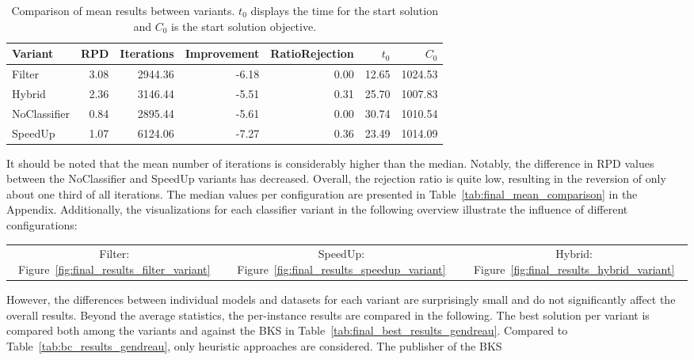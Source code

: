 \begin{table}
	\centering
	\small
	\begin{tabular}{lrrrrrr}
		\toprule
		Variant      & RPD  & Iterations & Improvement & RatioRejection & $t_0$ & $C_0$   \\
		\midrule
		Filter       & 3.08 & 2944.36    & -6.18       & 0.00           & 12.65 & 1024.53 \\
		Hybrid       & 2.36 & 3146.44    & -5.51       & 0.31           & 25.70 & 1007.83 \\
		NoClassifier & 0.84 & 2895.44    & -5.61       & 0.00           & 30.74 & 1010.54 \\
		SpeedUp      & 1.07 & 6124.06    & -7.27       & 0.36           & 23.49 & 1014.09 \\
		\bottomrule
	\end{tabular}
	\caption[Comparison of mean results between variants.]{Comparison of mean results between variants. $t_0$ displays the time for the start solution and $C_0$ is the start solution objective.}
	\label{tab:mean_final_results}
\end{table}
It should be noted that the mean number of iterations is considerably higher than the median. Notably, the difference in \gls{RPD}
values between the NoClassifier and SpeedUp variants has decreased. Overall, the rejection ratio is quite low, resulting in
the reversion of only about one third of all iterations. The median values per configuration are presented in
Table~\ref{tab:final_mean_comparison} in the Appendix. Additionally, the visualizations for each classifier variant in the following overview
illustrate the influence of different configurations:
\begin{table}[ht]
	\centering
	\setlength{\tabcolsep}{12pt}
	\begin{tabular}{ccc}
		Filter: Figure~\ref{fig:final_results_filter_variant} & SpeedUp: Figure~\ref{fig:final_results_speedup_variant} & Hybrid: Figure~\ref{fig:final_results_hybrid_variant}
	\end{tabular}
\end{table}
However, the differences between individual models and datasets for each variant are surprisingly small and do not significantly
affect the overall results. Beyond the average statistics, the per-instance results are compared in the following. The best solution
per variant is compared both among the variants and against the \gls{BKS} in Table~\ref{tab:final_best_results_gendreau}. Compared to Table~\ref{tab:bc_results_gendreau},
only heuristic approaches are considered. The publisher of the \gls{BKS}
